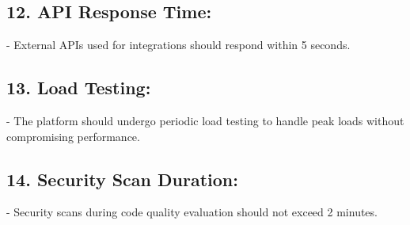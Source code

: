 \subsection*{12. API Response Time:}
    - External APIs used for integrations should respond within 5 seconds.

\subsection*{13. Load Testing:}
    - The platform should undergo periodic load testing to handle peak loads without compromising performance.

\subsection*{14. Security Scan Duration:}
    - Security scans during code quality evaluation should not exceed 2 minutes.







